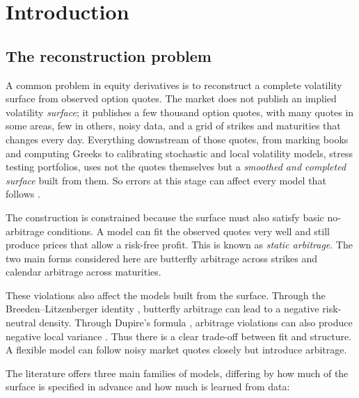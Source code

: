\chapter{Introduction}\label{ch:intro}

\section{The reconstruction problem}

A common problem in equity derivatives is to reconstruct a complete volatility surface from observed option quotes. The market does not publish an implied volatility \emph{surface}; it publishes a few thousand option quotes, with many quotes in some areas, few in others, noisy data, and a grid of strikes and maturities that changes every day. Everything downstream of those quotes, from marking books and computing Greeks to calibrating stochastic and local volatility models, stress testing portfolios, uses not the quotes themselves but a \emph{smoothed and completed surface} built from them. So errors at this stage can affect every model that follows \cite{fengler2009}.

The construction is constrained because the surface must also satisfy basic no-arbitrage conditions. A model can fit the observed quotes very well and still produce prices that allow a risk-free profit. This is known as \emph{static arbitrage}. The two main forms considered here are butterfly arbitrage across strikes and calendar arbitrage across maturities.

These violations also affect the models built from the surface. Through the Breeden--Litzenberger identity \cite{breeden1978}, butterfly arbitrage can lead to a negative risk-neutral density. Through Dupire's formula \cite{dupire1994}, arbitrage violations can also produce negative local variance \cite{fengler2009}. Thus there is a clear trade-off between fit and structure. A flexible model can follow noisy market quotes closely but introduce arbitrage.

The literature offers three main families of models, differing by how much of the surface is specified in advance and how much is learned from data:

